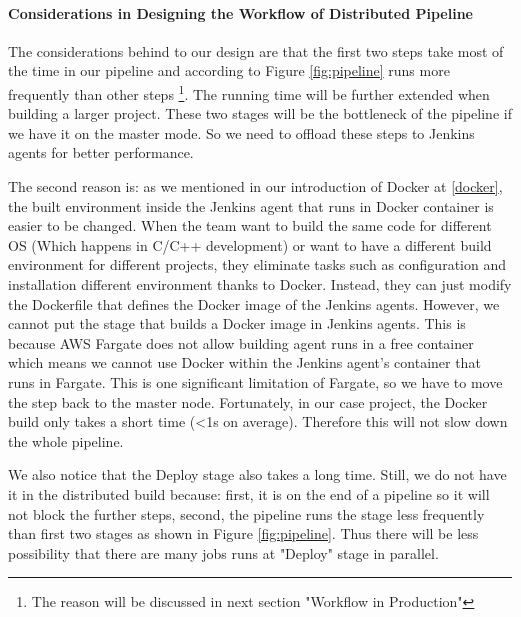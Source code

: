\paragraph[]{Considerations in Designing the Workflow of Distributed Pipeline}
The considerations behind to our design are that the first two steps take most of the time in our pipeline and according to Figure \ref{fig:pipeline} runs more frequently than other steps \footnote{The reason will be discussed in next section "Workflow in Production"}. The running time will be further extended when building a larger project. These two stages will be the bottleneck of the pipeline if we have it on the master mode. So we need to offload these steps to Jenkins agents for better performance.
\par
The second reason is: as we mentioned in our introduction of Docker at \ref{docker}, the built environment inside the Jenkins agent that runs in Docker container is easier to be changed. When the team want to build the same code for different OS (Which happens in C/C++ development) or want to have a different build environment for different projects, they eliminate tasks such as configuration and installation different environment thanks to Docker. Instead, they can just modify the Dockerfile that defines the Docker image of the Jenkins agents. However, we cannot put the stage that builds a Docker image in Jenkins agents. This is because AWS Fargate does not allow building agent runs in a free container which means we cannot use Docker within the Jenkins agent's container that runs in Fargate. This is one significant limitation of Fargate, so we have to move the step back to the master node. Fortunately, in our case project, the Docker build only takes a short time (<1s on average). Therefore this will not slow down the whole pipeline.
\par
We also notice that the Deploy stage also takes a long time. Still, we do not have it in the distributed build because: first, it is on the end of a pipeline so it will not block the further steps, second, the pipeline runs the stage less frequently than first two stages as shown in Figure \ref{fig:pipeline}. Thus there will be less possibility that there are many jobs runs at "Deploy" stage in parallel.
